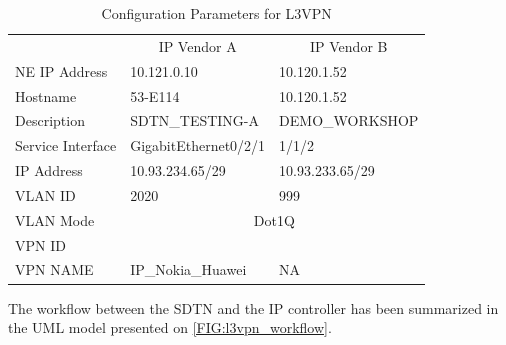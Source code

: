 \documentclass[a4paper,fleqn]{cas-dc}
\begin{document}
\begin{table}[]
\caption{Configuration Parameters for L3VPN}
\begin{adjustbox}{width=0.5\textwidth}
\small
\begin{tabular}{lll}
& \multicolumn{1}{c}{IP Vendor A} & \multicolumn{1}{c}{IP Vendor B} \\
{\color[HTML]{000000} NE IP Address} & {\color[HTML]{000000} 10.121.0.10}          & {\color[HTML]{000000} 10.120.1.52}     \\
\rowcolor[HTML]{F2F2F2} 
{\color[HTML]{000000} Hostname}            & {\color[HTML]{000000} 53-E114}              & {\color[HTML]{000000} 10.120.1.52}     \\
{\color[HTML]{000000} Description}         & {\color[HTML]{000000} SDTN\_TESTING-A}      & {\color[HTML]{000000} DEMO\_WORKSHOP} \\
\rowcolor[HTML]{F2F2F2} 
{\color[HTML]{000000} Service   Interface} & {\color[HTML]{000000} GigabitEthernet0/2/1} & {\color[HTML]{000000} 1/1/2}           \\
{\color[HTML]{000000} IP Address}          & {\color[HTML]{000000} 10.93.234.65/29}      & {\color[HTML]{000000} 10.93.233.65/29} \\
\rowcolor[HTML]{F2F2F2} 
{\color[HTML]{000000} VLAN   ID}           & {\color[HTML]{000000} 2020}                 & {\color[HTML]{000000} 999}             \\
{\color[HTML]{000000} VLAN Mode}           & \multicolumn{2}{c}{{\color[HTML]{000000} Dot1Q}}                                     \\
\rowcolor[HTML]{F2F2F2} 
{\color[HTML]{000000} VPN   ID}            & \multicolumn{2}{c}{\cellcolor[HTML]{F2F2F2}{\color[HTML]{000000} 15}} \\
{\color[HTML]{000000} VPN NAME}           & {\color[HTML]{000000} IP\_Nokia\_Huawei}                 & {\color[HTML]{000000} NA} 
\end{tabular}
\end{adjustbox}
\label{TAB:discovered_ip_l3vpn}
\end{table}

The workflow between the SDTN and the IP controller has been summarized in the UML model presented on \cref{FIG:l3vpn_workflow}. 
\end{document}
